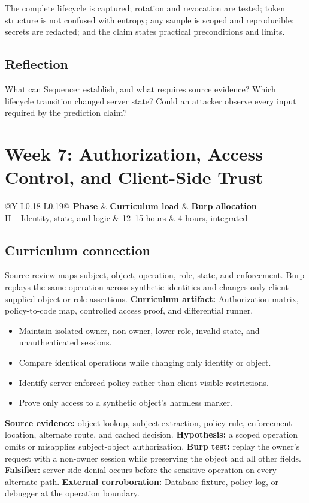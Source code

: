 \documentclass[11pt]{article}
\makeatletter
\newcommand{\weekheader}[5]{%
  \clearpage
  \section{Week #1: #2}
  \begin{tcolorbox}[colback=Navy,colframe=Navy,coltext=white]
    \begin{tabularx}{\linewidth}{@{}Y L{0.18\linewidth} L{0.19\linewidth}@{}}
      \textbf{Phase} & \textbf{Curriculum load} & \textbf{Burp allocation}\\
      #3 & #4 hours & #5 hours, integrated
    \end{tabularx}
  \end{tcolorbox}
}
\newcommand{\weekfield}[2]{%
  \Needspace{5\baselineskip}
  \subsection*{#1}
  #2
}
\newcommand{\curriculumartifact}[1]{\textbf{Curriculum artifact:} #1}
\newcommand{\externalproof}[1]{\textbf{External corroboration:} #1}
\makeatother
\begin{document}
\begin{checkpoints}
The complete lifecycle is captured; rotation and revocation are tested; token
structure is not confused with entropy; any sample is scoped and reproducible;
secrets are redacted; and the claim states practical preconditions and limits.
\end{checkpoints}

\weekfield{Reflection}{What can Sequencer establish, and what requires source
evidence? Which lifecycle transition changed server state? Could an attacker
observe every input required by the prediction claim?}

\weekheader{7}{Authorization, Access Control, and Client-Side Trust}{II -- Identity, state, and logic}{12--15}{4}

\weekfield{Curriculum connection}{Source review maps subject, object, operation,
role, state, and enforcement. Burp replays the same operation across synthetic
identities and changes only client-supplied object or role assertions.
\curriculumartifact{Authorization matrix, policy-to-code map, controlled access
proof, and differential runner.}}

\begin{objectivebox}
\begin{itemize}
  \item Maintain isolated owner, non-owner, lower-role, invalid-state, and unauthenticated sessions.
  \item Compare identical operations while changing only identity or object.
  \item Identify server-enforced policy rather than client-visible restrictions.
  \item Prove only access to a synthetic object's harmless marker.
\end{itemize}
\end{objectivebox}

\begin{bridgebox}
\textbf{Source evidence:} object lookup, subject extraction, policy rule,
enforcement location, alternate route, and cached decision. \textbf{Hypothesis:}
a scoped operation omits or misapplies subject-object authorization. \textbf{Burp
test:} replay the owner's request with a non-owner session while preserving the
object and all other fields. \textbf{Falsifier:} server-side denial occurs before
the sensitive operation on every alternate path. \externalproof{Database fixture,
policy log, or debugger at the operation boundary.}
\end{bridgebox}
\end{document}
